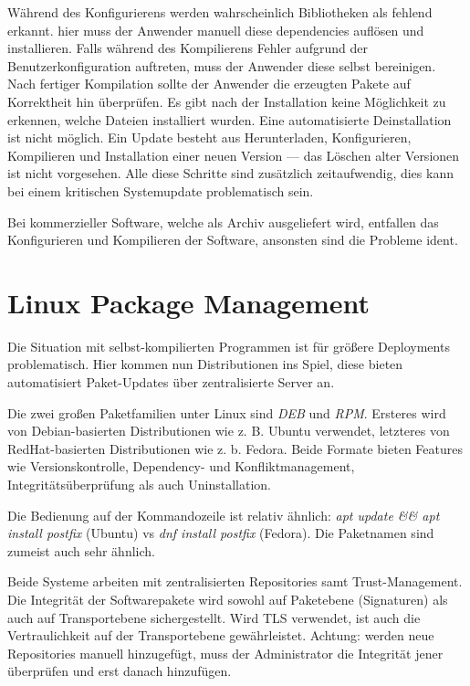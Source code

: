 Während des Konfigurierens werden wahrscheinlich Bibliotheken als fehlend erkannt. hier muss der Anwender manuell diese dependencies auflösen und installieren. Falls während des Kompilierens Fehler aufgrund der Benutzerkonfiguration auftreten, muss der Anwender diese selbst bereinigen. Nach fertiger Kompilation sollte der Anwender die erzeugten Pakete auf Korrektheit hin überprüfen. Es gibt nach der Installation keine Möglichkeit zu erkennen, welche Dateien installiert wurden. Eine automatisierte Deinstallation ist nicht möglich. Ein Update besteht aus Herunterladen, Konfigurieren, Kompilieren und Installation einer neuen Version --- das Löschen alter Versionen ist nicht vorgesehen. Alle diese Schritte sind zusätzlich zeitaufwendig, dies kann bei einem kritischen Systemupdate problematisch sein.

Bei kommerzieller Software, welche als Archiv ausgeliefert wird, entfallen das Konfigurieren und Kompilieren der Software, ansonsten sind die Probleme ident.

\section{Linux Package Management}

Die Situation mit selbst-kompilierten Programmen ist für größere Deployments problematisch. Hier kommen nun Distributionen ins Spiel, diese bieten automatisiert Paket-Updates über zentralisierte Server an.

Die zwei großen Paketfamilien unter Linux sind \textit{DEB} und \textit{RPM}.  Ersteres wird von Debian-basierten Distributionen wie z. B. Ubuntu verwendet, letzteres von RedHat-basierten Distributionen wie z. b. Fedora. Beide Formate bieten Features wie Versionskontrolle, Dependency- und Konfliktmanagement, Integritätsüberprüfung als auch Uninstallation.

Die Bedienung auf der Kommandozeile ist relativ ähnlich: \textit{apt update \&\& apt install postfix} (Ubuntu) vs \textit{dnf install postfix} (Fedora). Die Paketnamen sind zumeist auch sehr ähnlich.

Beide Systeme arbeiten mit zentralisierten Repositories samt Trust-Management. Die Integrität der Softwarepakete wird sowohl auf Paketebene (Signaturen) als auch auf Transportebene sichergestellt. Wird TLS verwendet, ist auch die Vertraulichkeit auf der Transportebene gewährleistet. Achtung: werden neue Repositories manuell hinzugefügt, muss der Administrator die Integrität jener überprüfen und erst danach hinzufügen.

